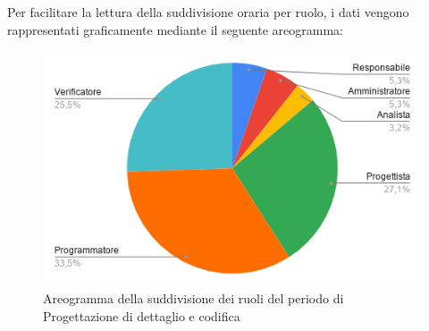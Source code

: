 \documentclass[../piano-di-progetto.tex]{subfiles}
\begin{document}
  Per facilitare la lettura della suddivisione oraria per ruolo, i dati vengono rappresentati graficamente mediante il seguente areogramma:
  \begin{figure}[H]
    \centering
    \includegraphics[width=12cm]{img/ruoli-codifica.png}
    \caption{Areogramma della suddivisione dei ruoli del periodo di Progettazione di dettaglio e codifica}
    \label{fig:ore-ruolo-codifica}
  \end{figure}
\end{document}
